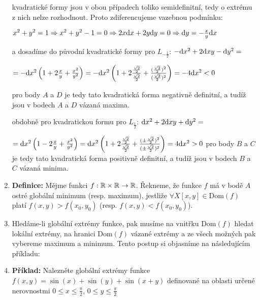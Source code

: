 \begin{enumerate}
kvadratické formy jsou v obou případech toliko semidefinitní, tedy o extrému z nich nelze rozhodnout. Proto zdiferencujeme vazebnou podmínku: 

$
x^2 + y^2 = 1 
\Rightarrow 
x^2 + y^2 - 1 = 0
\Rightarrow 
2x \mathrm{d} x + 2y \mathrm{d} y = 0
\Rightarrow 
\mathrm{d} y = -\frac{x}{y} \mathrm{d} x
$

a dosadíme do původní kvadratické formy pro $L_{-\frac{1}{2}}$:
$
-\mathrm{d} x^2 + 2\mathrm{d} xy - \mathrm{d} y^2 =
$

$
= -\mathrm{d} x^2 \left(1 + 2\frac{x}{y} + \frac{x^2}{y^2}\right)
= -\mathrm{d} x^2 \left(1 + 2\frac{\frac{\sqrt{2}}{2}}{\frac{\sqrt{2}}{2}} + \frac{(\frac{\sqrt{2}}{2})^2}{(\frac{\sqrt{2}}{2})^2}\right)
= -4\mathrm{d} x^2 < 0
$

pro body $A$ a $D$ je tedy tato kvadratická forma negativně definitní, a tudíž jsou v bodech $A$ a $D$ vázaná maxima.

obdobně pro kvadratickou formu pro $L_{\frac{1}{2}}$:
$
\mathrm{d} x^2 + 2\mathrm{d} xy + \mathrm{d} y^2 =
$

$
= \mathrm{d} x^2 \left(1 - 2\frac{x}{y} + \frac{x^2}{y^2}\right)
= \mathrm{d} x^2 \left(1 + 2\frac{\frac{\sqrt{2}}{2}}{\frac{\sqrt{2}}{2}} + \frac{(\pm \frac{\sqrt{2}}{2})^2}{(\pm \frac{\sqrt{2}}{2})^2}\right)
= 4\mathrm{d} x^2 > 0
$
pro body $B$ a $C$ je tedy tato kvadratická forma positivně definitní, a tudíž jsou v bodech $B$ a $C$ vázaná minima.

\item \textbf{Definice:} Mějme funkci $f:\mathbb{R} \times \mathbb{R} \rightarrow \mathbb{R}$. Řekneme, že funkce $f$ má v bodě $A$ ostré globální minimum (resp. maximum), jestliže $\forall X[x,y]  \in \mathrm{Dom}(f)$ platí $f(x,y) > f(x_0,y_0)$ (resp. $f(x,y) < f(x_0,y_0)$).

\item Hledáme-li globální extrémy funkce, pak musíme na vnitřku $\mathrm{Dom}(f)$ hledat lokální extrémy, na hranici $\mathrm{Dom}(f)$ vázané extrémy a ze všech možných pak vybereme maximum a minimum. Tento postup si objasníme na následujícím příkladu:

\item \textbf{Příklad:} Nalezněte globální extrémy funkce 
$f(x,y) = \sin (x) + \sin (y) + \sin (x+y)$
definované na oblasti určené nerovnostmi
$0 \leq x \leq \frac{\pi}{2}$,
$0 \leq y \leq \frac{\pi}{2}$


\end{enumerate}

